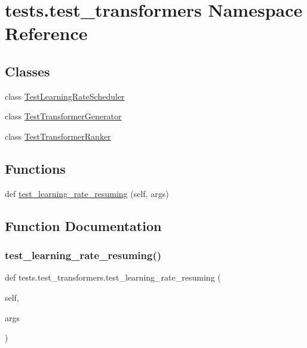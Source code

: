 \hypertarget{namespacetests_1_1test__transformers}{}\section{tests.\+test\+\_\+transformers Namespace Reference}
\label{namespacetests_1_1test__transformers}
\subsection*{Classes}
\begin{DoxyCompactItemize}
\item 
class \hyperlink{classtests_1_1test__transformers_1_1TestLearningRateScheduler}{Test\+Learning\+Rate\+Scheduler}
\item 
class \hyperlink{classtests_1_1test__transformers_1_1TestTransformerGenerator}{Test\+Transformer\+Generator}
\item 
class \hyperlink{classtests_1_1test__transformers_1_1TestTransformerRanker}{Test\+Transformer\+Ranker}
\end{DoxyCompactItemize}
\subsection*{Functions}
\begin{DoxyCompactItemize}
\item 
def \hyperlink{namespacetests_1_1test__transformers_a8d6cf0022229f5deba37f23f30601117}{test\+\_\+learning\+\_\+rate\+\_\+resuming} (self, args)
\end{DoxyCompactItemize}


\subsection{Function Documentation}
\mbox{\label{namespacetests_1_1test__transformers_a8d6cf0022229f5deba37f23f30601117}} 
\subsubsection{\texorpdfstring{test\+\_\+learning\+\_\+rate\+\_\+resuming()}{test\_learning\_rate\_resuming()}}
{\footnotesize\ttfamily def tests.\+test\+\_\+transformers.\+test\+\_\+learning\+\_\+rate\+\_\+resuming (\begin{DoxyParamCaption}\item[{}]{self,  }\item[{}]{args }\end{DoxyParamCaption})}

